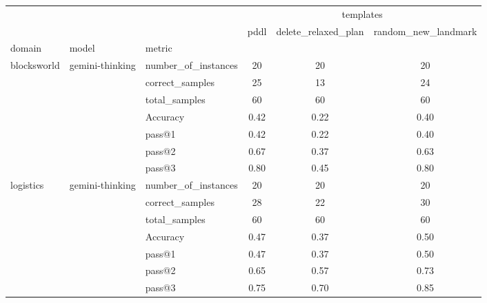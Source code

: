 \begin{tabular}{lll|ccc}
\toprule
 &  &  & \multicolumn{3}{c}{templates} \\
 &  &  & pddl & delete\_relaxed\_plan & random\_new\_landmark \\
domain & model & metric &  &  &  \\
\midrule
\multirow[t]{7}{*}{blocksworld} & \multirow[t]{7}{*}{gemini-thinking} & number\_of\_instances & 20 & 20 & 20 \\
 &  & correct\_samples & 25 & 13 & 24 \\
 &  & total\_samples & 60 & 60 & 60 \\
 &  & Accuracy & 0.42 & 0.22 & 0.40 \\
 &  & pass@1 & 0.42 & 0.22 & 0.40 \\
 &  & pass@2 & 0.67 & 0.37 & 0.63 \\
 &  & pass@3 & 0.80 & 0.45 & 0.80 \\
\cline{1-6} \cline{2-6}
\multirow[t]{7}{*}{logistics} & \multirow[t]{7}{*}{gemini-thinking} & number\_of\_instances & 20 & 20 & 20 \\
 &  & correct\_samples & 28 & 22 & 30 \\
 &  & total\_samples & 60 & 60 & 60 \\
 &  & Accuracy & 0.47 & 0.37 & 0.50 \\
 &  & pass@1 & 0.47 & 0.37 & 0.50 \\
 &  & pass@2 & 0.65 & 0.57 & 0.73 \\
 &  & pass@3 & 0.75 & 0.70 & 0.85 \\
\cline{1-6} \cline{2-6}
\bottomrule
\end{tabular}
